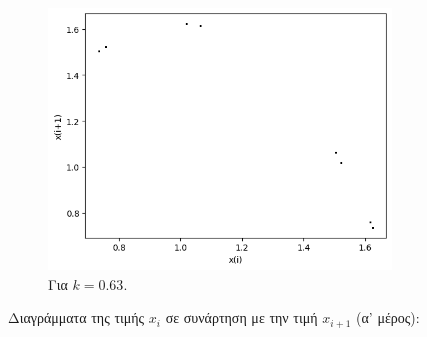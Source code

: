 \begin{figure}[h!]
\begin{subfigure}[b]{0.4\textwidth}
		\includegraphics[width=\textwidth]{LateX images/graphs q09/g13}
		\caption{Για $k=0.63$.}
		\label{f:k52}
	\end{subfigure}
	\hfill
	\caption{Διαγράμματα της τιμής \(x_i\) σε συνάρτηση με την τιμή \(x_{i+1}\) (α' μέρος):}
\end{figure}
